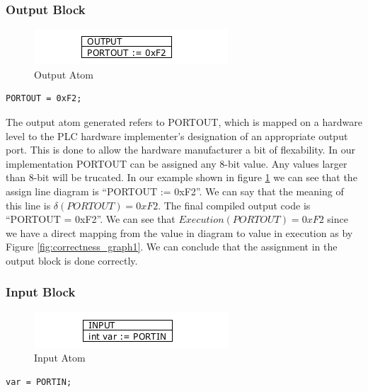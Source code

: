 \subsubsection{Output Block}

\begin{figure}[h]
	\centering
	\includegraphics[width=\imgmedphoto]{./images/correctness_atom_output.png}
	\caption{Output Atom}
	\label{fig:correctness_atom_output}
\end{figure}

\begin{lstlisting}[frame=single]
PORTOUT = 0xF2;
\end{lstlisting}

The output atom generated refers to PORTOUT, which is mapped on a hardware level to the PLC hardware implementer's designation of an appropriate output port. This is done to allow the hardware manufacturer a bit of flexability. In our implementation PORTOUT can be assigned any 8-bit value. Any values larger than 8-bit will be trucated. In our example shown in figure \ref{fig:correctness_atom_output} we can see that the assign line diagram is ``PORTOUT := 0xF2''. We can say that the meaning of this line is $\delta(PORTOUT) = 0xF2$. The final compiled output code is ``PORTOUT = 0xF2''. We can see that $Execution(PORTOUT) = 0xF2$ since we have a direct mapping from the value in diagram to value in execution as by Figure \ref{fig:correctness_graph1}. We can conclude that the assignment in the output block is done correctly.


\subsubsection{Input Block}

\begin{figure}[h]
	\centering
	\includegraphics[width=\imgmedphoto]{./images/correctness_atom_input.png}
	\caption{Input Atom}
	\label{fig:correctness_atom_input}
\end{figure}

\begin{lstlisting}[frame=single]
var = PORTIN;
\end{lstlisting}


